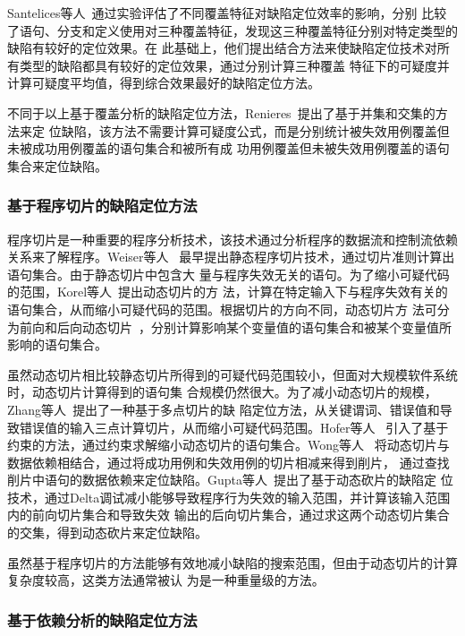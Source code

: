 Santelices等人~\cite{santelices2009lightweight}通过实验评估了不同覆盖特征对缺陷定位效率的影响，分别
比较了语句、分支和定义使用对三种覆盖特征，发现这三种覆盖特征分别对特定类型的缺陷有较好的定位效果。在
此基础上，他们提出结合方法来使缺陷定位技术对所有类型的缺陷都具有较好的定位效果，通过分别计算三种覆盖
特征下的可疑度并计算可疑度平均值，得到综合效果最好的缺陷定位方法。

不同于以上基于覆盖分析的缺陷定位方法，Renieres~\cite{renieres2003fault}提出了基于并集和交集的方法来定
位缺陷，该方法不需要计算可疑度公式，而是分别统计被失效用例覆盖但未被成功用例覆盖的语句集合和被所有成
功用例覆盖但未被失效用例覆盖的语句集合来定位缺陷。

\subsubsection{基于程序切片的缺陷定位方法}
程序切片是一种重要的程序分析技术，该技术通过分析程序的数据流和控制流依赖关系来了解程序。Weiser等人
~\cite{weiser1981program}最早提出静态程序切片技术，通过切片准则计算出语句集合。由于静态切片中包含大
量与程序失效无关的语句。为了缩小可疑代码的范围，Korel等人~\cite{korel1988dynamic}提出动态切片的方
法，计算在特定输入下与程序失效有关的语句集合，从而缩小可疑代码的范围。根据切片的方向不同，动态切片方
法可分为前向和后向动态切片~\cite{korel1994forward}，分别计算影响某个变量值的语句集合和被某个变量值所
影响的语句集合。

虽然动态切片相比较静态切片所得到的可疑代码范围较小，但面对大规模软件系统时，动态切片计算得到的语句集
合规模仍然很大。为了减小动态切片的规模，Zhang等人~\cite{zhang2007locating}提出了一种基于多点切片的缺
陷定位方法，从关键谓词、错误值和导致错误值的输入三点计算切片，从而缩小可疑代码范围。Hofer等人
~\cite{hofer2012combining}引入了基于约束的方法，通过约束求解缩小动态切片的语句集合。Wong等人
~\cite{wong2004execution}将动态切片与数据依赖相结合，通过将成功用例和失效用例的切片相减来得到削片，
通过查找削片中语句的数据依赖来定位缺陷。Gupta等人~\cite{gupta2005locating}提出了基于动态砍片的缺陷定
位技术，通过Delta调试减小能够导致程序行为失效的输入范围，并计算该输入范围内的前向切片集合和导致失效
输出的后向切片集合，通过求这两个动态切片集合的交集，得到动态砍片来定位缺陷。

虽然基于程序切片的方法能够有效地减小缺陷的搜索范围，但由于动态切片的计算复杂度较高，这类方法通常被认
为是一种重量级的方法。

\subsubsection{基于依赖分析的缺陷定位方法}

